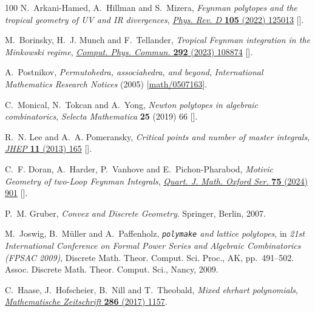 \documentclass[12pt,a4paper]{article}
\theoremstyle{plain}
\theoremstyle{remark}
\begin{document}
\begin{thebibliography}{100}
N.~Arkani-Hamed, A.~Hillman and S.~Mizera, \emph{{Feynman polytopes and the
  tropical geometry of UV and IR divergences}},
  \href{https://doi.org/10.1103/PhysRevD.105.125013}{\emph{Phys. Rev. D}
  {\bfseries 105} (2022) 125013}
  [\href{https://arxiv.org/abs/2202.12296}{{}}].

M.~Borinsky, H.~J. Munch and F.~Tellander, \emph{{Tropical Feynman integration
  in the Minkowski regime}},
  \href{https://doi.org/10.1016/j.cpc.2023.108874}{\emph{Comput. Phys. Commun.}
  {\bfseries 292} (2023) 108874}
  [\href{https://arxiv.org/abs/2302.08955}{{}}].

A.~Postnikov, \emph{Permutohedra, associahedra, and beyond},
  {\emph{International Mathematics Research Notices} (2005) }
  [\href{https://arxiv.org/abs/math/0507163}{{\ttfamily math/0507163}}].

C.~Monical, N.~Tokcan and A.~Yong, \emph{Newton polytopes in algebraic
  combinatorics}, {\emph{Selecta Mathematica} {\bfseries 25} (2019) 66}
  [\href{https://arxiv.org/abs/1703.02583}{{}}].

R.~N. Lee and A.~A. Pomeransky, \emph{{Critical points and number of master
  integrals}}, \href{https://doi.org/10.1007/JHEP11(2013)165}{\emph{JHEP}
  {\bfseries 11} (2013) 165} [\href{https://arxiv.org/abs/1308.6676}{{}}].

C.~F. Doran, A.~Harder, P.~Vanhove and E.~Pichon-Pharabod, \emph{{Motivic
  Geometry of two-Loop Feynman Integrals}},
  \href{https://doi.org/10.1093/qmath/haae015}{\emph{Quart. J. Math. Oxford
  Ser.} {\bfseries 75} (2024) 901}
  [\href{https://arxiv.org/abs/2302.14840}{{}}].

P.~M. Gruber, \emph{Convex and Discrete Geometry}. Springer, Berlin, 2007.

M.~Joswig, B.~M\"uller and A.~Paffenholz, \emph{{\tt polymake} and lattice
  polytopes},  in \emph{21st {I}nternational {C}onference on {F}ormal {P}ower
  {S}eries and {A}lgebraic {C}ombinatorics ({FPSAC} 2009)}, Discrete Math.
  Theor. Comput. Sci. Proc., AK, pp.~491--502.
\newblock Assoc. Discrete Math. Theor. Comput. Sci., Nancy, 2009.

C.~Haase, J.~Hofscheier, B.~Nill and T.~Theobald, \emph{Mixed ehrhart
  polynomials},
  \href{https://doi.org/10.1007/s00209-016-1818-6}{\emph{Mathematische
  Zeitschrift} {\bfseries 286} (2017) 1157}.


\end{thebibliography}
\end{document}
